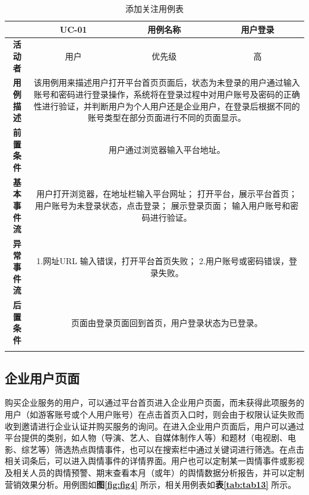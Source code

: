 \begin{longtable}[c]{c|ccc}
	\caption{添加关注用例表}
	\label{tab:tab12}\\
	\shline
	\multicolumn{1}{c|}{\textbf{用例编号}} & \multicolumn{1}{c|}{UC-01} & \multicolumn{1}{c|}{用例名称} &  用户登录\\ \hline
	\endhead
	\multicolumn{1}{c|}{\textbf{活动者}} & \multicolumn{1}{c|}{用户} & \multicolumn{1}{c|}{优先级} &高  \\ \hline
	\textbf{用例描述} & \multicolumn{3}{p{12cm}}{该用例用来描述用户打开平台首页页面后，状态为未登录的用户通过输入账号和密码进行登录操作，系统将在登录过程中对用户账号及密码的正确性进行验证，并判断用户为个人用户还是企业用户，在登录后根据不同的账号类型在部分页面进行不同的页面显示。} \\ \hline
	\textbf{前置条件}& \multicolumn{3}{p{12cm}}{用户通过浏览器输入平台地址。} \\ \hline
	\textbf{基本事件流}& \multicolumn{3}{p{12cm}}{用户打开浏览器，在地址栏输入平台网址；\newline
		打开平台，展示平台首页；\newline
		用户账号为未登录状态，点击登录；\newline
		展示登录页面；\newline
		输入用户账号和密码进行验证。} \\ \hline
	\textbf{异常事件流}& \multicolumn{3}{p{12cm}}{1.网址URL 输入错误，打开平台首页失败；\newline
		2.用户账号或密码错误，登录失败。
	} \\ \hline
	\textbf{后置条件}& \multicolumn{3}{p{12cm}}{页面由登录页面回到首页，用户登录状态为已登录。} \\ \shline
\end{longtable}

\subsection{企业用户页面}
购买企业服务的用户，可以通过平台首页进入企业用户页面，而未获得此项服务的用户（如游客账号或个人用户账号）在点击首页入口时，则会由于权限认证失败而收到邀请进行企业认证并购买服务的询问。在进入企业用户页面后，用户可以通过平台提供的类别，如人物（导演、艺人、自媒体制作人等）和题材（电视剧、电影、综艺等）筛选热点舆情事件，也可以在搜索栏中通过关键词进行筛选。在点击相关词条后，可以进入舆情事件的详情界面。用户也可以定制某一舆情事件或影视及相关人员的舆情预警、期末查看本月（或年）的舆情数据分析报告，并可以定制营销效果分析。用例图如\textbf{图\ref{fig:fig4}} 所示，相关用例表如\textbf{表\ref{tab:tab13}} 所示。

